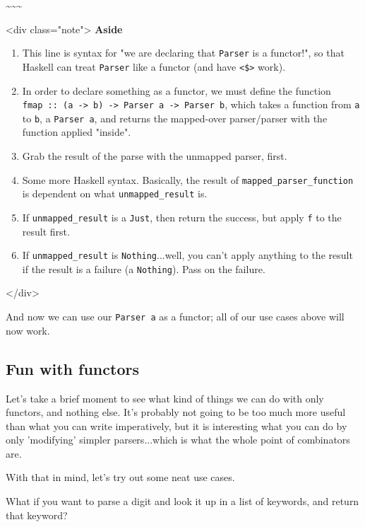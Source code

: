 \documentclass[]{article}
\begin{document}
\textasciitilde{}\textasciitilde{}\textasciitilde{}

\textless{}div class="note"\textgreater{} \textbf{Aside}

\begin{enumerate}
\tightlist
\item
  This line is syntax for "we are declaring that \texttt{Parser} is a functor!",
  so that Haskell can treat \texttt{Parser} like a functor (and have
  \texttt{\textless{}\$\textgreater{}} work).
\item
  In order to declare something as a functor, we must define the function
  \texttt{fmap\ ::\ (a\ -\textgreater{}\ b)\ -\textgreater{}\ Parser\ a\ -\textgreater{}\ Parser\ b},
  which takes a function from \texttt{a} to \texttt{b}, a \texttt{Parser\ a},
  and returns the mapped-over parser/parser with the function applied "inside".
\item
  Grab the result of the parse with the unmapped parser, first.
\item
  Some more Haskell syntax. Basically, the result of
  \texttt{mapped\_parser\_function} is dependent on what
  \texttt{unmapped\_result} is.
\item
  If \texttt{unmapped\_result} is a \texttt{Just}, then return the success, but
  apply \texttt{f} to the result first.
\item
  If \texttt{unmapped\_result} is \texttt{Nothing}...well, you can't apply
  anything to the result if the result is a failure (a \texttt{Nothing}). Pass
  on the failure.
\end{enumerate}

\textless{}/div\textgreater{}

And now we can use our \texttt{Parser\ a} as a functor; all of our use cases
above will now work.

\subsection{Fun with functors}

Let's take a brief moment to see what kind of things we can do with only
functors, and nothing else. It's probably not going to be too much more useful
than what you can write imperatively, but it is interesting what you can do by
only 'modifying' simpler parsers...which is what the whole point of combinators
are.

With that in mind, let's try out some neat use cases.

What if you want to parse a digit and look it up in a list of keywords, and
return that keyword?
\end{document}
